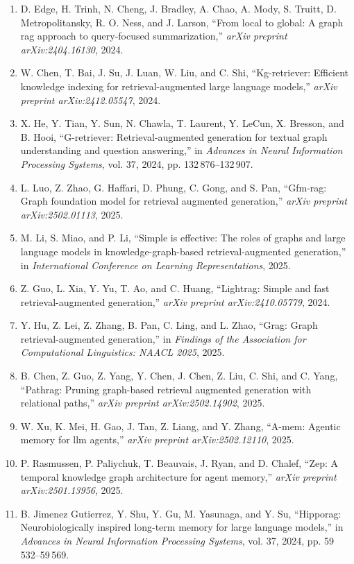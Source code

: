 \documentclass[10pt,UTF8,fontset=fandol]{ctexart}
\begin{document}
\begin{enumerate}[leftmargin=2.4em,labelsep=0.4em,itemsep=0.15em]
\item D. Edge, H. Trinh, N. Cheng, J. Bradley, A. Chao, A. Mody, S. Truitt, D. Metropolitansky, R. O. Ness, and J. Larson, ``From local to global: A graph rag approach to query-focused summarization,'' \textit{arXiv preprint arXiv:2404.16130}, 2024.
\item W. Chen, T. Bai, J. Su, J. Luan, W. Liu, and C. Shi, ``Kg-retriever: Efficient knowledge indexing for retrieval-augmented large language models,'' \textit{arXiv preprint arXiv:2412.05547}, 2024.
\item X. He, Y. Tian, Y. Sun, N. Chawla, T. Laurent, Y. LeCun, X. Bresson, and B. Hooi, ``G-retriever: Retrieval-augmented generation for textual graph understanding and question answering,'' in \textit{Advances in Neural Information Processing Systems}, vol. 37, 2024, pp. 132\,876--132\,907.
\item L. Luo, Z. Zhao, G. Haffari, D. Phung, C. Gong, and S. Pan, ``Gfm-rag: Graph foundation model for retrieval augmented generation,'' \textit{arXiv preprint arXiv:2502.01113}, 2025.
\item M. Li, S. Miao, and P. Li, ``Simple is effective: The roles of graphs and large language models in knowledge-graph-based retrieval-augmented generation,'' in \textit{International Conference on Learning Representations}, 2025.
\item Z. Guo, L. Xia, Y. Yu, T. Ao, and C. Huang, ``Lightrag: Simple and fast retrieval-augmented generation,'' \textit{arXiv preprint arXiv:2410.05779}, 2024.
\item Y. Hu, Z. Lei, Z. Zhang, B. Pan, C. Ling, and L. Zhao, ``Grag: Graph retrieval-augmented generation,'' in \textit{Findings of the Association for Computational Linguistics: NAACL 2025}, 2025.
\item B. Chen, Z. Guo, Z. Yang, Y. Chen, J. Chen, Z. Liu, C. Shi, and C. Yang, ``Pathrag: Pruning graph-based retrieval augmented generation with relational paths,'' \textit{arXiv preprint arXiv:2502.14902}, 2025.
\item W. Xu, K. Mei, H. Gao, J. Tan, Z. Liang, and Y. Zhang, ``A-mem: Agentic memory for llm agents,'' \textit{arXiv preprint arXiv:2502.12110}, 2025.
\item P. Rasmussen, P. Paliychuk, T. Beauvais, J. Ryan, and D. Chalef, ``Zep: A temporal knowledge graph architecture for agent memory,'' \textit{arXiv preprint arXiv:2501.13956}, 2025.
\item B. Jimenez Gutierrez, Y. Shu, Y. Gu, M. Yasunaga, and Y. Su, ``Hipporag: Neurobiologically inspired long-term memory for large language models,'' in \textit{Advances in Neural Information Processing Systems}, vol. 37, 2024, pp. 59\,532--59\,569.

\end{enumerate}
\end{document}

